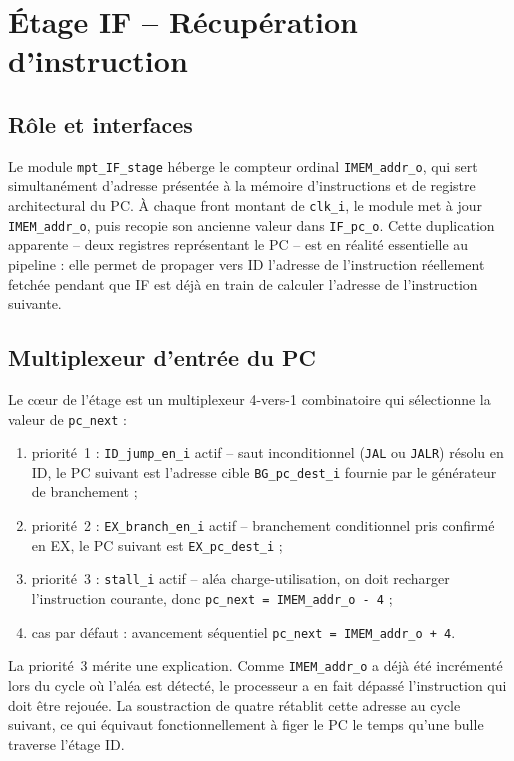 \documentclass[11pt,a4paper,oneside]{report}
\begin{document}
\section{Étage IF -- Récupération d'instruction}
\label{sec:if}

\subsection{Rôle et interfaces}
Le module \texttt{mpt\_IF\_stage} héberge le compteur ordinal
\texttt{IMEM\_addr\_o}, qui sert simultanément d'adresse présentée
à la mémoire d'instructions et de registre architectural du PC. À
chaque front montant de \texttt{clk\_i}, le module met à jour
\texttt{IMEM\_addr\_o}, puis recopie son ancienne valeur dans
\texttt{IF\_pc\_o}. Cette duplication apparente -- deux registres
représentant le PC -- est en réalité essentielle au pipeline : elle
permet de propager vers ID l'adresse de l'instruction réellement
fetchée pendant que IF est déjà en train de calculer l'adresse de
l'instruction suivante.

\subsection{Multiplexeur d'entrée du PC}
Le c\oe{}ur de l'étage est un multiplexeur 4-vers-1
combinatoire qui sélectionne la valeur de \texttt{pc\_next} :
\begin{enumerate}
  \item priorité~1 : \texttt{ID\_jump\_en\_i} actif  --  saut
        inconditionnel (\texttt{JAL} ou \texttt{JALR}) résolu en
        ID, le PC suivant est l'adresse cible
        \texttt{BG\_pc\_dest\_i} fournie par le générateur de
        branchement ;
  \item priorité~2 : \texttt{EX\_branch\_en\_i} actif  -- 
        branchement conditionnel pris confirmé en EX, le PC
        suivant est \texttt{EX\_pc\_dest\_i} ;
  \item priorité~3 : \texttt{stall\_i} actif  --  aléa
        charge-utilisation, on doit recharger l'instruction
        courante, donc \texttt{pc\_next = IMEM\_addr\_o - 4} ;
  \item cas par défaut : avancement séquentiel
        \texttt{pc\_next = IMEM\_addr\_o + 4}.
\end{enumerate}
La priorité~3 mérite une explication. Comme \texttt{IMEM\_addr\_o}
a déjà été incrémenté lors du cycle où l'aléa est détecté, le
processeur a en fait dépassé l'instruction qui doit être rejouée.
La soustraction de quatre rétablit cette adresse au cycle suivant,
ce qui équivaut fonctionnellement à figer le PC le temps qu'une
bulle traverse l'étage ID.
\end{document}
